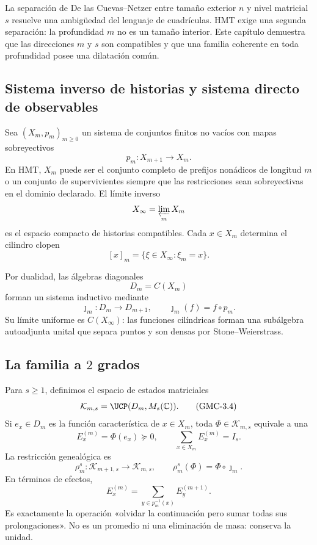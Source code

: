 La separación de De las Cuevas--Netzer entre tamaño exterior $n$ y nivel
matricial $s$ resuelve una ambigüedad del lenguaje de cuadrículas. HMT exige
una segunda separación: la profundidad $m$ no es un tamaño interior. Este
capítulo demuestra que las direcciones $m$ y $s$ son compatibles y que una
familia coherente en toda profundidad posee una dilatación común.

\subsection{Sistema inverso de historias y sistema directo de observables}

Sea $(X_m,p_m)_{m\ge0}$ un sistema de conjuntos finitos no vacíos con mapas
sobreyectivos
\[
 p_m:X_{m+1}\longrightarrow X_m.
 \tag{GMC-3.1}
\]
En HMT, $X_m$ puede ser el conjunto completo de prefijos nonádicos de
longitud $m$ o un conjunto de supervivientes siempre que las restricciones
sean sobreyectivas en el dominio declarado. El límite inverso
\[
 X_\infty=\varprojlim_m X_m
\]
es el espacio compacto de historias compatibles. Cada $x\in X_m$ determina
el cilindro clopen
\[
 [x]_m=\{\xi\in X_\infty:\xi_m=x\}.
 \tag{GMC-3.2}
\]

Por dualidad, las álgebras diagonales
\[
 D_m=C(X_m)
\]
forman un sistema inductivo mediante
\[
 \jmath_m:D_m\longrightarrow D_{m+1},
 \qquad \jmath_m(f)=f\circ p_m.
 \tag{GMC-3.3}
\]
Su límite uniforme es $C(X_\infty)$: las funciones cilíndricas forman una
subálgebra autoadjunta unital que separa puntos y son densas por
Stone--Weierstrass.

\subsection{La familia a \(2\) grados}

Para $s\ge1$, definimos el espacio de estados matriciales
\[
 \mathcal K_{m,s}=\UCP(D_m,M_s(\mathbb C)).
 \tag{GMC-3.4}
\]
Si $e_x\in D_m$ es la función característica de $x\in X_m$, toda
$\Phi\in\mathcal K_{m,s}$ equivale a una \POVM
\[
 E_x^{(m)}=\Phi(e_x)\succeq0,
 \qquad
 \sum_{x\in X_m}E_x^{(m)}=I_s.
 \tag{GMC-3.5}
\]
La restricción genealógica es
\[
 \rho_m^s:\mathcal K_{m+1,s}\longrightarrow\mathcal K_{m,s},
 \qquad
 \rho_m^s(\Phi)=\Phi\circ\jmath_m.
 \tag{GMC-3.6}
\]
En términos de efectos,
\[
 E_x^{(m)}=\sum_{y\in p_m^{-1}(x)}E_y^{(m+1)}.
 \tag{GMC-3.7}
\]
Es exactamente la operación «olvidar la continuación pero sumar todas sus
prolongaciones». No es un promedio ni una eliminación de masa: conserva la unidad.

